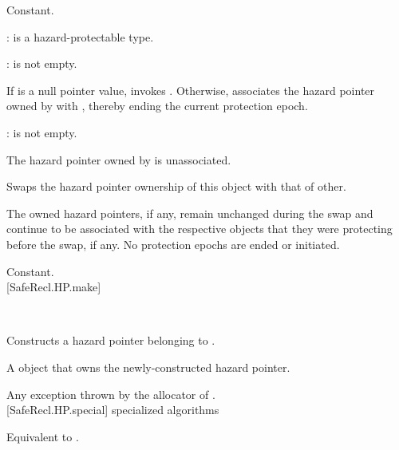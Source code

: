 \pnum
\complexity Constant.
\\


\pnum
{}:  is a hazard-protectable type.

\pnum
{}:  is not empty.

\pnum
\effects If  is a null pointer value, invokes . Otherwise, associates the hazard pointer owned by  with , thereby ending the current protection epoch.
\\


\pnum
{}:  is not empty.

\pnum
\postconditions The hazard pointer owned by  is unassociated.
\\


\pnum
\effects Swaps the hazard pointer ownership of this object with that of other. \begin{note} The owned hazard pointers, if any, remain unchanged during the swap and continue to be associated with the respective objects that they were protecting before the swap, if any. No protection epochs are ended or initiated. \end{note}

\pnum
\complexity Constant.
\\

[SafeRecl.HP.make]{}

\\
\hspace*{1.1em}

\pnum
\effects Constructs a hazard pointer belonging to .

\pnum
\returns A  object that owns the newly-constructed hazard pointer.

\pnum
\throws Any exception thrown by the allocator of .
\\

[SafeRecl.HP.special]{ specialized algorithms}


\pnum
\effects Equivalent to .
\\
